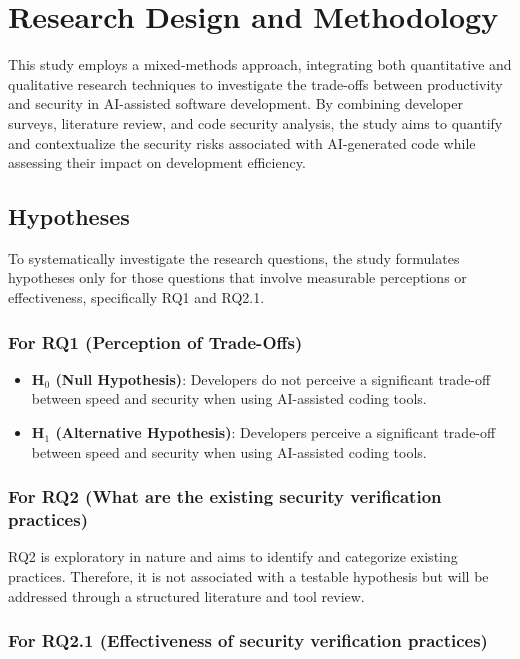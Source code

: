 \section{Research Design and Methodology}
This study employs a mixed-methods approach, integrating both quantitative and qualitative research techniques to investigate the trade-offs between productivity and security in AI-assisted software development. By combining developer surveys, literature review, and code security analysis, the study aims to quantify and contextualize the security risks associated with AI-generated code while assessing their impact on development efficiency.

\subsection{Hypotheses}

To systematically investigate the research questions, the study formulates hypotheses only for those questions that involve measurable perceptions or effectiveness, specifically RQ1 and RQ2.1.

\subsubsection{For RQ1 (Perception of Trade-Offs)}

\begin{itemize}
    \item \textbf{H$_{0}$ (Null Hypothesis)}: Developers do not perceive a significant trade-off between speed and security when using AI-assisted coding tools.
    \item \textbf{H$_{1}$ (Alternative Hypothesis)}: Developers perceive a significant trade-off between speed and security when using AI-assisted coding tools.
\end{itemize}

\subsubsection{For RQ2 (What are the existing security verification practices)}

RQ2 is exploratory in nature and aims to identify and categorize existing practices. Therefore, it is not associated with a testable hypothesis but will be addressed through a structured literature and tool review.

\subsubsection{For RQ2.1 (Effectiveness of security verification practices)}

